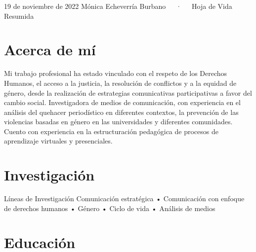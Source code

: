 \documentclass[11pt,a4paper,]{awesome-cv}
\begin{document}
\makecvheader

\makecvfooter
  {19 de noviembre de 2022}
    {Mónica Echeverría Burbano~~~·~~~Hoja de Vida Resumida}
  {\thepage}





\hypertarget{acerca-de-muxed}{%
\section{Acerca de mí}\label{acerca-de-muxed}}

Mi trabajo profesional ha estado vinculado con el respeto de los
Derechos Humanos, el acceso a la justicia, la resolución de conflictos y
a la equidad de género, desde la realización de estrategias
comunicativas participativas a favor del cambio social. Investigadora de
medios de comunicación, con experiencia en el análisis del quehacer
periodístico en diferentes contextos, la prevención de las violencias
basadas en género en las universidades y diferentes comunidades. Cuento
con experiencia en la estructuración pedagógica de procesos de
aprendizaje virtuales y presenciales.

\hypertarget{investigaciuxf3n}{%
\section{Investigación}\label{investigaciuxf3n}}

\begin{cvskills}
  \cvskill
    {Líneas de Investigación}
    {Comunicación estratégica • Comunicación con enfoque de derechos humanos • Género • Ciclo de vida • \newline
    Análisis de medios}
\end{cvskills}

\hypertarget{educaciuxf3n}{%
\section{Educación}\label{educaciuxf3n}}
\end{document}
